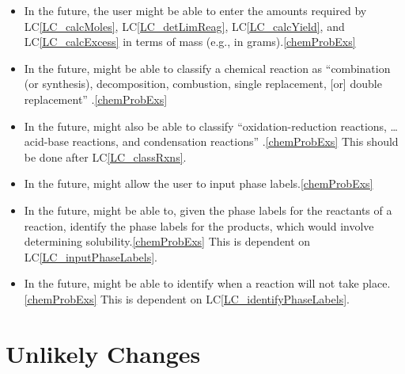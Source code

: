 \documentclass[12pt]{article}
\newcounter{lcnum} %
\newcommand{\lcref}[1]{LC\ref{#1}}
\begin{document}
\begin{itemize}
  \item[LC\refstepcounter{lcnum}\thelcnum\label{LC_termsOfMass}:] In the future,
    the user might be able to enter the amounts required by \lcref{LC_calcMoles},
    \lcref{LC_detLimReag}, \lcref{LC_calcYield}, and \lcref{LC_calcExcess} in
    terms of mass (e.g., in grams).\cref{chemProbExs}

  \item[LC\refstepcounter{lcnum}\thelcnum\label{LC_classRxns}:] In the future,
    \progname{} might be able to classify a chemical reaction as ``combination
    (or synthesis), decomposition, combustion, single replacement, [or] double
    replacement'' \cite[p.~301]{lund_introduction_2023}.\cref{chemProbExs}

  \item[LC\refstepcounter{lcnum}\thelcnum\label{LC_classMoreRxns}:] In the
    future, \progname{} might also be able to classify ``oxidation-reduction
    reactions, \dots acid-base reactions, and condensation reactions''
    \cite[p.~301]{lund_introduction_2023}.\cref{chemProbExs} This should be
    done after \lcref{LC_classRxns}.

  \item[LC\refstepcounter{lcnum}\thelcnum\label{LC_inputPhaseLabels}:] In the
    future, \progname{} might allow the user to input phase
    labels.\cref{chemProbExs}

  \item[LC\refstepcounter{lcnum}\thelcnum\label{LC_identifyPhaseLabels}:] In
    the future, \progname{} might be able to, given the phase labels for the
    reactants of a reaction, identify the phase labels for the products, which
    would involve determining solubility.\cref{chemProbExs} This is dependent
    on \lcref{LC_inputPhaseLabels}.

  \item[LC\refstepcounter{lcnum}\thelcnum\label{LC_rxnTakePlace}:] In the
    future, \progname{} might be able to identify when a reaction will not take
    place.\cref{chemProbExs}
    This is dependent on \lcref{LC_identifyPhaseLabels}.

\end{itemize}

\section{Unlikely Changes} \label{sec_UCs}
\end{document}
